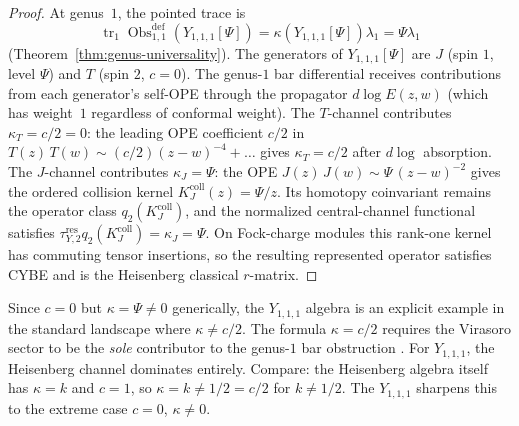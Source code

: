 \begin{proof}
At genus~$1$, the pointed trace is
\[
\operatorname{tr}_1\operatorname{Obs}^{\mathrm{def}}_{1,1}(Y_{1,1,1}[\Psi])
=\kappa(Y_{1,1,1}[\Psi])\lambda_1
=\Psi\lambda_1
\]
(Theorem~\ref{thm:genus-universality}). The generators of
$Y_{1,1,1}[\Psi]$ are $J$ (spin $1$, level $\Psi$) and
$T$ (spin $2$, $c = 0$). The genus-$1$ bar differential
receives contributions from each generator's self-OPE through the
propagator $d \log E(z,w)$ (which has weight~$1$ regardless
of conformal weight). The $T$-channel contributes
$\kappa_T = c/2 = 0$: the leading OPE coefficient $c/2$ in
$T(z)\,T(w) \sim (c/2)(z{-}w)^{-4} + \ldots$ gives
$\kappa_T = c/2$ after $d\log$ absorption.
The $J$-channel contributes
$\kappa_J = \Psi$: the OPE $J(z)\,J(w) \sim \Psi\,(z{-}w)^{-2}$
gives the ordered collision kernel
$K_J^{\mathrm{coll}}(z)=\Psi/z$.  Its homotopy coinvariant remains
the operator class $q_2(K_J^{\mathrm{coll}})$, and the normalized
central-channel functional satisfies
$\tau_{Y,2}^{\mathrm{res}}q_2(K_J^{\mathrm{coll}})=\kappa_J=\Psi$.
On Fock-charge modules this rank-one kernel has commuting tensor
insertions, so the resulting represented operator satisfies CYBE and
is the Heisenberg classical $r$-matrix.
\end{proof}

\begin{remark}%
\label{rem:y111-kappa-not-c-over-2}
Since $c = 0$ but $\kappa = \Psi \neq 0$ generically, the
$Y_{1,1,1}$ algebra is an explicit example in the standard
landscape where $\kappa \neq c/2$. The
formula $\kappa = c/2$ requires the Virasoro sector to be the
\emph{sole} contributor to the genus-$1$ bar obstruction
. For $Y_{1,1,1}$, the Heisenberg channel dominates
entirely. Compare: the Heisenberg algebra itself has
$\kappa = k$ and $c = 1$, so $\kappa = k \neq 1/2 = c/2$
for $k \neq 1/2$. The $Y_{1,1,1}$ sharpens this to the
extreme case $c = 0$, $\kappa \neq 0$.
\end{remark}

